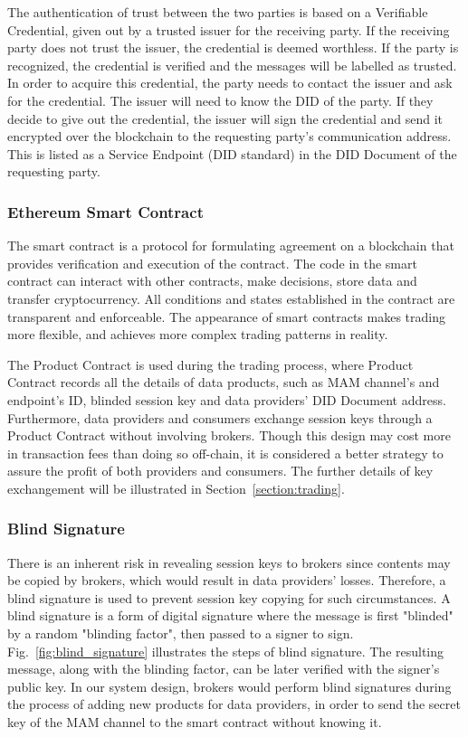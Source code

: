 \documentclass[conference]{IEEEtran}
\begin{document}
The authentication of trust between the two parties is based on a Verifiable Credential, given out by a trusted issuer for the receiving party. If the receiving party does not trust the issuer, the credential is deemed worthless. If the party is recognized, the credential is verified and the messages will be labelled as trusted. In order to acquire this credential, the party needs to contact the issuer and ask for the credential. The issuer will need to know the DID of the party. If they decide to give out the credential, the issuer will sign the credential and send it encrypted over the blockchain to the requesting party's communication address. This is listed as a Service Endpoint (DID standard) in the DID Document of the requesting party.

\subsubsection{Ethereum Smart Contract}
The smart contract is a protocol for formulating agreement on a blockchain that provides verification and execution of the contract. The code in the smart contract can interact with other contracts, make decisions, store data and transfer cryptocurrency. All conditions and states established in the contract are transparent and enforceable. The appearance of smart contracts makes trading more flexible, and achieves more complex trading patterns in reality.

The Product Contract is used during the trading process, where Product Contract records all the details of data products, such as MAM channel's and endpoint's ID, blinded session key and data providers' DID Document address. Furthermore, data providers and consumers exchange session keys through a Product Contract without involving brokers. Though this design may cost more in transaction fees than doing so off-chain, it is considered a better strategy to assure the profit of both providers and consumers. The further details of key exchangement will be illustrated in Section~\ref{section:trading}.

\subsubsection{Blind Signature}
There is an inherent risk in revealing session keys to brokers since contents may be copied by brokers, which would result in data providers' losses. Therefore, a blind signature is used to prevent session key copying for such circumstances. A blind signature\cite{blindSig} is a form of digital signature where the message is first "blinded" by a random "blinding factor", then passed to a signer to sign. Fig.~\ref{fig:blind_signature} illustrates the steps of blind signature. The resulting message, along with the blinding factor, can be later verified with the signer's public key. In our system design, brokers would perform blind signatures during the process of adding new products for data providers, in order to send the secret key of the MAM channel to the smart contract without knowing it.
\end{document}

